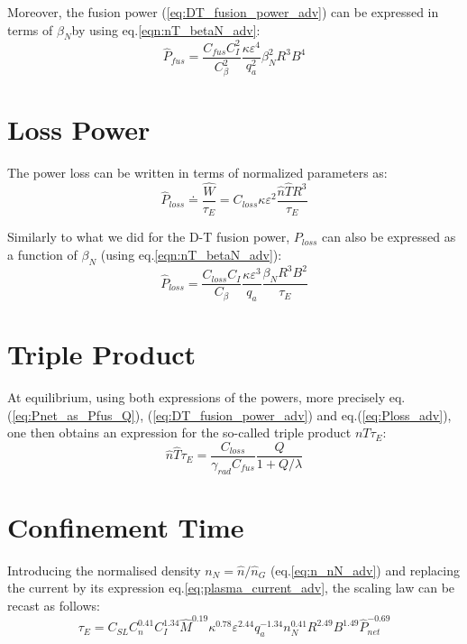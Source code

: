 Moreover, the fusion power (\ref{eq:DT_fusion_power_adv}) can be expressed in terms of $\beta_N$by using eq.\ref{eqn:nT_betaN_adv}:
\begin{equation}
\boxed{
		\hat P_{fus} 
	= 
	\frac{C_{fus}C_I^2}{C_\beta^2} \frac{\kappa \varepsilon^4}{q_a^2} 
	\beta_N^2 R^3 B^4
}
\label{eq:DT_fusion_power_betaN_adv}
\end{equation}

\section{Loss Power}
The power loss can be written in terms of normalized parameters as:
\begin{equation}
	\hat P_{loss} \doteq \frac{\hat W}{\tau_E} 
	= C_{loss} \kappa \varepsilon^2  \frac{\hat n \hat T R^3}{\tau_E}
\label{eq:Ploss_adv}
\end{equation}

Similarly to what we did for the D-T fusion power, $P_{loss}$ can also be expressed as a function of $\beta_N$ (using eq.\ref{eqn:nT_betaN_adv}):
\begin{equation}
	\hat P_{loss} 
	= 
	\frac{C_{loss}C_I}{C_\beta}  \frac{\kappa \varepsilon^3}{q_a}
	\frac{\beta_N R^3 B^2}{\tau_E}
\label{eq:Ploss_betaN_adv}
\end{equation}

\section{Triple Product}
At equilibrium, using both expressions of the powers, more precisely eq.(\ref{eq:Pnet_as_Pfus_Q}), (\ref{eq:DT_fusion_power_adv}) and eq.(\ref{eq:Ploss_adv}), one then obtains an expression for the so-called triple product $nT\tau_E$:
\begin{equation}
	\hat n \hat T \tau_E = \frac{C_{loss}}{\gamma_{rad} C_{fus}} \frac{Q}{1+Q/\lambda}
\label{eq:nTtau_Q_adv}
\end{equation}


\section{Confinement Time}
Introducing the normalised density $n_N = \hat n/\hat n_G$ (eq.\ref{eq:n_nN_adv}) and replacing the current by its expression eq.\ref{eq:plasma_current_adv}, the scaling law can be recast as follows:
\begin{equation*}
\tau_E = C_{SL} C_n^{0.41} C_I^{1.34} \hat M^{0.19} \kappa^{0.78} \varepsilon^{2.44} q_a^{-1.34}
n_N^{0.41} R^{2.49} B^{1.49} \hat P_{net}^{-0.69}
\end{equation*}

